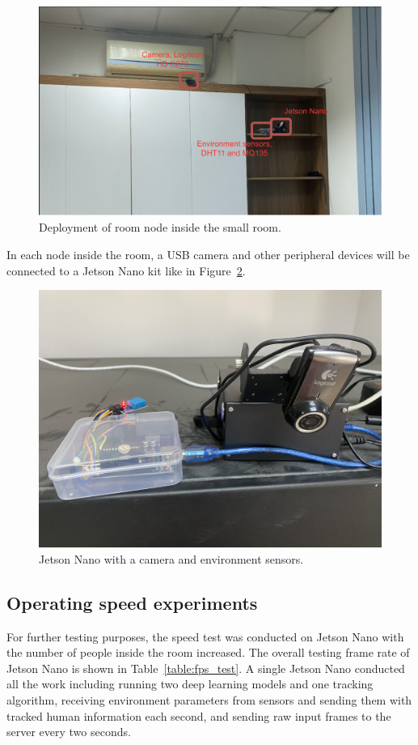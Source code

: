 \documentclass[../main.tex]{subfiles}
\begin{document}
\begin{figure}[h!]
\centering
\includegraphics[width=\linewidth]{Figure/edge_smallroom.pdf}
\caption{Deployment of room node inside the small room.}
\label{fig:edge_smallroom}
\end{figure}

In each node inside the room, a USB camera and other peripheral devices will be connected to a Jetson Nano kit like in Figure~\ref{fig:device_combine}.

\begin{figure}[h!]
\centering
\includegraphics[width=0.8\linewidth]{Figure/devices_combine.jpg}
\caption{Jetson Nano with a camera and environment sensors.}
\label{fig:device_combine}
\end{figure}

\subsection{Operating speed experiments}
For further testing purposes, the speed test was conducted on Jetson Nano with the number of people inside the room increased. The overall testing frame rate of Jetson Nano is shown in Table~\ref{table:fps_test}. A single Jetson Nano conducted all the work including running two deep learning models and one tracking algorithm, receiving environment parameters from sensors and sending them with tracked human information each second, and sending raw input frames to the server every two seconds.
\end{document}
